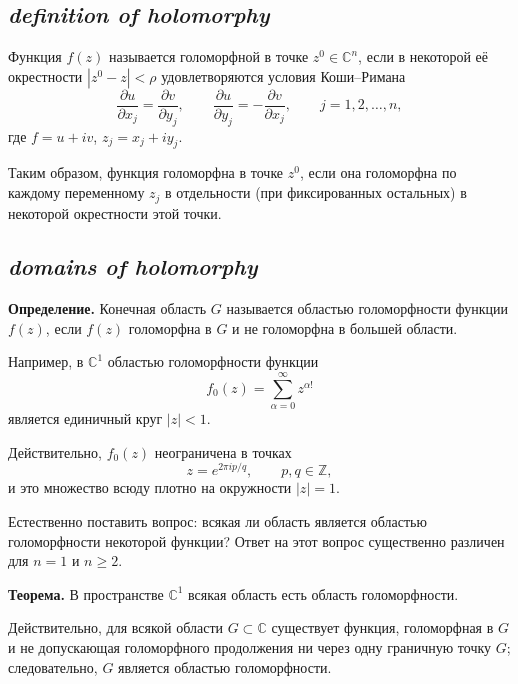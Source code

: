 \subsection*{ \textit{definition of holomorphy}}
\begin{rusblock}
Функция $f(z)$ называется голоморфной в точке $z^0\in\mathbb C^n$, если в некоторой её окрестности $|z^0-z|<\rho$ удовлетворяются условия Коши--Римана
\[
\frac{\partial u}{\partial x_j}=\frac{\partial v}{\partial y_j},\qquad
\frac{\partial u}{\partial y_j}=-\frac{\partial v}{\partial x_j},\qquad j=1,2,\ldots,n,
\]
где $f=u+iv$, $z_j=x_j+iy_j$.

Таким образом, функция голоморфна в точке $z^0$, если она голоморфна по каждому переменному $z_j$ в отдельности (при фиксированных остальных) в некоторой окрестности этой точки.
\end{rusblock}

\subsection*{ \textit{domains of holomorphy}}
\begin{rusblock}
\textbf{Определение.} Конечная область $G$ называется областью голоморфности функции $f(z)$, если $f(z)$ голоморфна в $G$ и не голоморфна в большей области.

Например, в $\mathbb C^1$ областью голоморфности функции
\[
f_0(z)=\sum_{\alpha=0}^{\infty} z^{\alpha!}
\]
является единичный круг $|z|<1$.

Действительно, $f_0(z)$ неограничена в точках
\[
z=e^{2\pi i p/q},\qquad p,q\in\mathbb Z,
\]
и это множество всюду плотно на окружности $|z|=1$.

Естественно поставить вопрос: всякая ли область является областью голоморфности некоторой функции? Ответ на этот вопрос существенно различен для $n=1$ и $n\ge2$.

\textbf{Теорема.} В пространстве $\mathbb C^1$ всякая область есть область голоморфности.

Действительно, для всякой области $G\subset\mathbb C$ существует функция, голоморфная в $G$ и не допускающая голоморфного продолжения ни через одну граничную точку $G$; следовательно, $G$ является областью голоморфности.
\end{rusblock}

